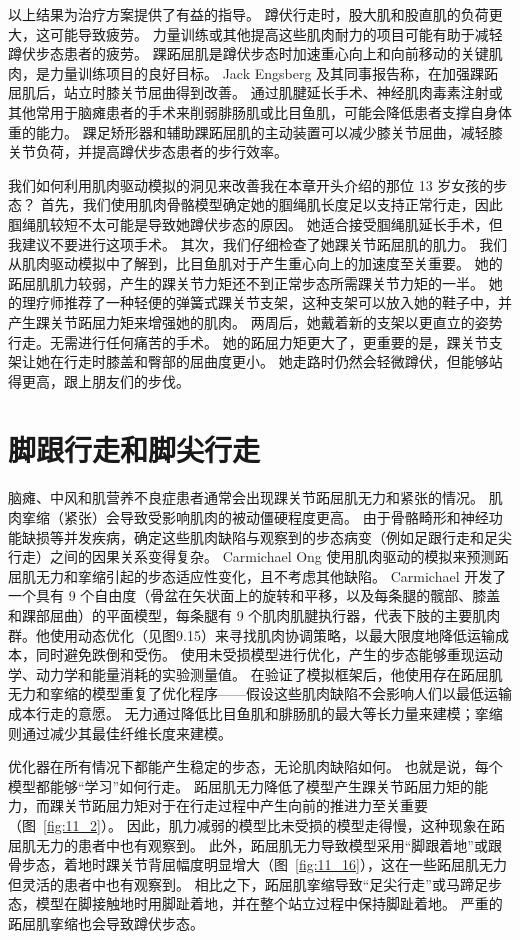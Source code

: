 以上结果为治疗方案提供了有益的指导。
蹲伏行走时，股大肌和股直肌的负荷更大，这可能导致疲劳。
力量训练或其他提高这些肌肉耐力的项目可能有助于减轻蹲伏步态患者的疲劳。
踝跖屈肌是蹲伏步态时加速重心向上和向前移动的关键肌肉，是力量训练项目的良好目标。
Jack Engsberg 及其同事\cite{engsberg2006increasing}报告称，在加强踝跖屈肌后，站立时膝关节屈曲得到改善。
通过肌腱延长手术、神经肌肉毒素注射或其他常用于脑瘫患者的手术来削弱腓肠肌或比目鱼肌，可能会降低患者支撑自身体重的能力。
踝足矫形器和辅助踝跖屈肌的主动装置可以减少膝关节屈曲，减轻膝关节负荷，并提高蹲伏步态患者的步行效率。


我们如何利用肌肉驱动模拟的洞见来改善我在本章开头介绍的那位 13 岁女孩的步态？
首先，我们使用肌肉骨骼模型确定她的腘绳肌长度足以支持正常行走，因此腘绳肌较短不太可能是导致她蹲伏步态的原因。
她适合接受腘绳肌延长手术，但我建议不要进行这项手术。
其次，我们仔细检查了她踝关节跖屈肌的肌力。
我们从肌肉驱动模拟中了解到，比目鱼肌对于产生重心向上的加速度至关重要。
她的跖屈肌肌力较弱，产生的踝关节力矩还不到正常步态所需踝关节力矩的一半。
她的理疗师推荐了一种轻便的弹簧式踝关节支架，这种支架可以放入她的鞋子中，并产生踝关节跖屈力矩来增强她的肌肉。
两周后，她戴着新的支架以更直立的姿势行走。无需进行任何痛苦的手术。
她的跖屈力矩更大了，更重要的是，踝关节支架让她在行走时膝盖和臀部的屈曲度更小。
她走路时仍然会轻微蹲伏，但能够站得更高，跟上朋友们的步伐。


\section{脚跟行走和脚尖行走}

脑瘫、中风和肌营养不良症患者通常会出现踝关节跖屈肌无力和紧张的情况。
肌肉挛缩（紧张）会导致受影响肌肉的被动僵硬程度更高。
由于骨骼畸形和神经功能缺损等并发疾病，确定这些肌肉缺陷与观察到的步态病变（例如足跟行走和足尖行走）之间的因果关系变得复杂。
Carmichael Ong 使用肌肉驱动的模拟来预测跖屈肌无力和挛缩引起的步态适应性变化，且不考虑其他缺陷。
Carmichael 开发了一个具有 9 个自由度（骨盆在矢状面上的旋转和平移，以及每条腿的髋部、膝盖和踝部屈曲）的平面模型，每条腿有 9 个肌肉肌腱执行器，代表下肢的主要肌肉群。他使用动态优化（见图9.15）来寻找肌肉协调策略，以最大限度地降低运输成本，同时避免跌倒和受伤。
使用未受损模型进行优化，产生的步态能够重现运动学、动力学和能量消耗的实验测量值。
在验证了模拟框架后，他使用存在跖屈肌无力和挛缩的模型重复了优化程序——假设这些肌肉缺陷不会影响人们以最低运输成本行走的意愿。
无力通过降低比目鱼肌和腓肠肌的最大等长力量来建模；挛缩则通过减少其最佳纤维长度来建模。


优化器在所有情况下都能产生稳定的步态，无论肌肉缺陷如何。
也就是说，每个模型都能够“学习”如何行走。
跖屈肌无力降低了模型产生踝关节跖屈力矩的能力，而踝关节跖屈力矩对于在行走过程中产生向前的推进力至关重要（图~\ref{fig:11_2}）。
因此，肌力减弱的模型比未受损的模型走得慢，这种现象在跖屈肌无力的患者中也有观察到。
此外，跖屈肌无力导致模型采用“脚跟着地”或跟骨步态，着地时踝关节背屈幅度明显增大（图~\ref{fig:11_16}），这在一些跖屈肌无力但灵活的患者中也有观察到。
相比之下，跖屈肌挛缩导致“足尖行走”或马蹄足步态，模型在脚接触地时用脚趾着地，并在整个站立过程中保持脚趾着地。
严重的跖屈肌挛缩也会导致蹲伏步态。



